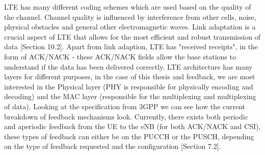 \documentclass{article}
\begin{document}
LTE has many different coding schemes which are used based on the quality of the channel. Channel quality is influenced by interference from other cells, noise,  physical obstacles and general other electromagnetic waves.  Link adaptation is a crucial aspect of LTE that allows for the most efficient and robust transmission of data \cite{umts_sesia}[Section 10.2]. Apart from link adaption, LTE has "received receipts", in the form of ACK/NACK - these ACK/NACK fields allow the base stations to understand if the data has been delivered correctly. LTE architecture has many layers for different purposes, in the case of this thesis and feedback, we are most interested in the Physical layer (PHY is responsible for physically encoding and decoding) and the MAC layer (responsible for the multiplexing and multiplexing of data). Looking at the specification from 3GPP we can see how the current breakdown of feedback mechanisms look. Currently, there exists both periodic and aperiodic feedback from the UE to the eNB (for both ACK/NACK and CSI), these types of feedback can either be on the PUCCH or the PUSCH, depending on the type of feedback requested and the configuration \cite{ETSITS136213}[Section 7.2]. 
\end{document}
